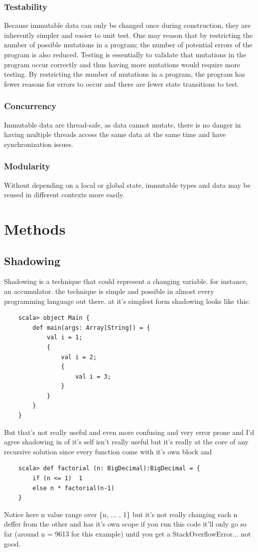 \documentclass[12pt,twoside]{article}
\begin{document}
\subsubsection{Testability} Because immutable data can only be changed once during construction, they are inherently
simpler and easier to unit test. One may reason that by restricting the number of possible mutations
in a program; the number of potential errors of the program is also reduced. Testing is essentially
to validate that mutations in the program occur correctly and thus having more mutations would require more testing. By restricting the number of mutations in a program, the program has
fewer reasons for errors to occur and there are fewer state transitions to test.

\subsubsection{Concurrency} Immutable data are thread-safe, as data cannot mutate, there is no danger in having
multiple threads access the same data at the same time and have synchronization issues.

\subsubsection{Modularity} Without depending on a local or global state, immutable types and data may be reused
in different contexts more easily.

\section{Methods}

\subsection{Shadowing}

Shadowing is a technique that could represent a changing variable. for instance, an accumulator. the technique is simple and possible in almost every programming language out there.
at it's simplest form shadowing looks like this:
\begin{lstlisting}
    scala> object Main {
        def main(args: Array[String]) = {
            val i = 1;
            {
                val i = 2;
                {
                    val i = 3;
                }
            }
        }  
    }    
\end{lstlisting}
But that's not really useful and even more confusing and very error prone and I'd agree shadowing in of it's self isn't really useful but it's really at the core of any recursive solution since every function come with it's own block and 
\begin{lstlisting} 
    scala> def factorial (n: BigDecimal):BigDecimal = {
        if (n <= 1)  1
        else n * factorial(n-1)
    }
\end{lstlisting}
Notice here n value range over \{n, ... , 1\} but it's not really changing each n deffer from the other and has it's own scope
if you run this code it'll only go so far (around  n = 9613 for this example) until you get a StackOverflowError... not good.
\end{document}
